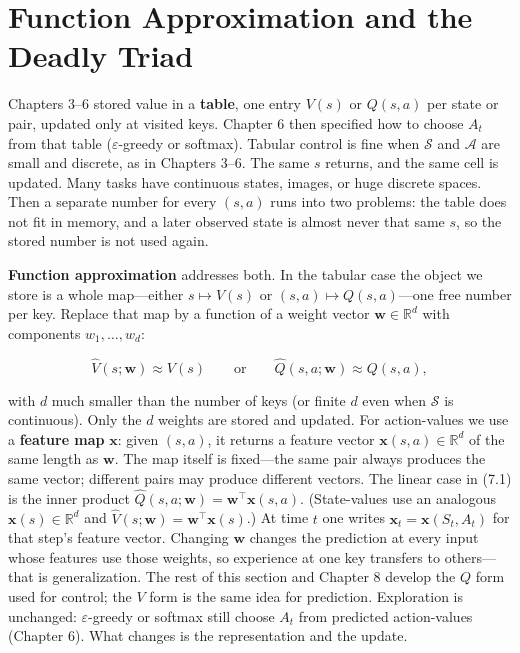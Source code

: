 \chapter{Function Approximation and the Deadly Triad}

Chapters 3--6 stored value in a \textbf{table}, one entry $V(s)$ or $Q(s,a)$ per state or pair, updated only at visited keys. Chapter 6 then specified how to choose $A_t$ from that table ($\varepsilon$-greedy or softmax). Tabular control is fine when $\mathcal{S}$ and $\mathcal{A}$ are small and discrete, as in Chapters 3--6. The same $s$ returns, and the same cell is updated. Many tasks have continuous states, images, or huge discrete spaces. Then a separate number for every $(s,a)$ runs into two problems: the table does not fit in memory, and a later observed state is almost never that same $s$, so the stored number is not used again.

\textbf{Function approximation} addresses both. In the tabular case the object we store is a whole map---either $s\mapsto V(s)$ or $(s,a)\mapsto Q(s,a)$---one free number per key. Replace that map by a function of a weight vector $\mathbf{w}\in\mathbb{R}^d$ with components $w_1,\ldots,w_d$:

\[
\hat{V}(s;\mathbf{w})\approx V(s)
\qquad\text{or}\qquad
\hat{Q}(s,a;\mathbf{w})\approx Q(s,a),
\]

with $d$ much smaller than the number of keys (or finite $d$ even when $\mathcal{S}$ is continuous). Only the $d$ weights are stored and updated. For action-values we use a \textbf{feature map} $\mathbf{x}$: given $(s,a)$, it returns a feature vector $\mathbf{x}(s,a)\in\mathbb{R}^d$ of the same length as $\mathbf{w}$. The map itself is fixed---the same pair always produces the same vector; different pairs may produce different vectors. The linear case in (7.1) is the inner product $\hat{Q}(s,a;\mathbf{w})=\mathbf{w}^\top\mathbf{x}(s,a)$. (State-values use an analogous $\mathbf{x}(s)\in\mathbb{R}^d$ and $\hat{V}(s;\mathbf{w})=\mathbf{w}^\top\mathbf{x}(s)$.) At time $t$ one writes $\mathbf{x}_t=\mathbf{x}(S_t,A_t)$ for that step's feature vector. Changing $\mathbf{w}$ changes the prediction at every input whose features use those weights, so experience at one key transfers to others---that is generalization. The rest of this section and Chapter 8 develop the $Q$ form used for control; the $V$ form is the same idea for prediction. Exploration is unchanged: $\varepsilon$-greedy or softmax still choose $A_t$ from predicted action-values (Chapter 6). What changes is the representation and the update.

